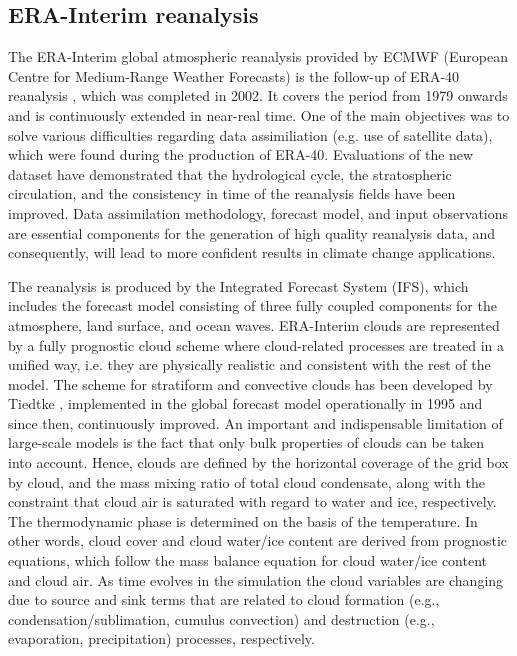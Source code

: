 

\subsection{ERA-Interim reanalysis}\label{sec:era}

The ERA-Interim global atmospheric reanalysis \cite{Dee2011} provided by ECMWF 
(European Centre for Medium-Range Weather Forecasts) 
is the follow-up of ERA-40 reanalysis \cite{Uppala2005}, which was completed in 2002.
It covers the period from 1979 onwards and is continuously extended in near-real time.
One of the main objectives was to solve various difficulties regarding data assimiliation
(e.g. use of satellite data), which were found during the production of ERA-40. 
Evaluations of the new dataset have demonstrated that the hydrological cycle, the stratospheric circulation, and
the consistency in time of the reanalysis fields have been improved.
Data assimilation methodology, forecast model, and input observations
are essential components for the generation of high quality reanalysis data,
and consequently, will lead to more confident results in climate change applications. 

The reanalysis is produced by the Integrated Forecast System (IFS), which includes
the forecast model consisting of three fully coupled components for the atmosphere, land surface, and ocean waves.
ERA-Interim clouds are represented by a fully prognostic cloud scheme where cloud-related processes
are treated in a unified way, i.e. they are physically realistic and consistent with the rest of the model.
The scheme for stratiform and convective clouds has been developed by Tiedtke \cite{Tiedtke1993}, 
implemented in the global forecast model operationally in 1995 and since then, continuously improved.
An important and indispensable limitation of large-scale models is the fact that only bulk
properties of clouds can be taken into account. Hence, clouds are defined by
the horizontal coverage of the grid box by cloud, and the mass mixing ratio of total cloud condensate,
along with the constraint that cloud air is saturated with regard to water and ice, respectively.
The thermodynamic phase is determined on the basis of the temperature.
In other words, cloud cover and cloud water/ice content are derived from prognostic equations,
which follow the mass balance equation for cloud water/ice content and cloud air.
As time evolves in the simulation the cloud variables are changing due to source and
sink terms that are related to cloud formation (e.g., condensation/sublimation, cumulus convection)
and destruction (e.g., evaporation, precipitation) processes, respectively.

